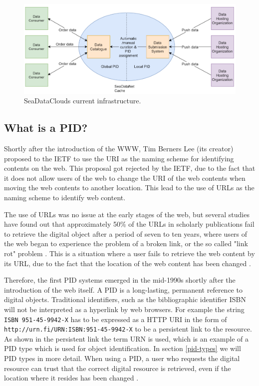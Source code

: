 
\begin{figure}[H]
\centering
\includegraphics[scale=0.6]{Images/SDC_current.png}
\caption{SeaDataClouds current infrastructure.}
\label{fig:sdc_cur}
\end{figure}

\subsection{What is a PID?}\label{pid-intr}
Shortly after the introduction of the WWW, Tim Berners Lee (its creator) proposed to the IETF to use the URI as the naming scheme for identifying contents on the web. This proposal got rejected by the IETF, due to the fact that it does not allow users of the web to change the URI of the web contents when moving the web contents to another location. This lead to the use of URLs as the naming scheme to identify web content. 
 
The use of URLs was no issue at the early stages of the web, but several studies have found out that approximately 50\% of the URLs in scholarly publications fail to retrieve the digital object after a period of seven to ten years, where users of the web began to experience the problem of a broken link, or the so called "link rot" problem \cite{rot-link1, rot-link2}. This is a situation where a user fails to retrieve the web content by its URL, due to the fact that the location of the web content has been changed \cite{icn-bd, ark-id}. 

Therefore, the first PID systems emerged in the mid-1990s shortly after the introduction of the web itself. A PID is a long-lasting, permanent reference to digital objects. Traditional identifiers, such as the bibliographic identifier ISBN will not be interpreted as a hyperlink by web browsers. For example the string \texttt{ISBN 951-45-9942-X} has to be expressed as a HTTP URI in the form of \texttt{http://urn.fi/URN:ISBN:951-45-9942-X} to be a persistent link to the resource. As shown in the persistent link the term URN is used, which is an example of a PID type which is used for object identification. In section \ref{pid-types} we will PID types in more detail. When using a PID, a user who requests the digital resource can trust that the correct digital resource is retrieved, even if the location where it resides has been changed \cite{pid-oview}.

